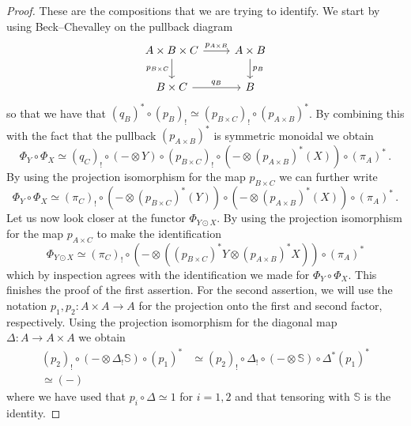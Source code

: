 \documentclass[10pt,a4paper]{amsart}
\newcommand{\bS}{\mathbb{S}}
\begin{document}
\begin{proof}
  These are the compositions that we are trying to identify.
  We start by using Beck--Chevalley on the pullback diagram
  \[
  \begin{tikzcd}
    A \times B \times C \arrow[r,"p_{A \times B}"] \arrow[d,"p_{B \times C}"'] & A \times B \arrow[d,"p_B"] \\
    B \times C \arrow[r,"q_B"] & B
  \end{tikzcd}
  \]
  so that we have that $(q_B)^* \circ (p_B)_! \simeq (p_{B \times C})_! \circ (p_{A \times B})^*$. By combining this with the fact that the pullback $(p_{A \times B})^*$ is symmetric monoidal we obtain
  \[
  \Phi_Y \circ \Phi_X \simeq (q_C)_! \circ (-\otimes Y) \circ (p_{B \times C})_! \circ (- \otimes (p_{A \times B})^*(X)) \circ (\pi_A)^* \,.
  \]
  By using the projection isomorphism for the map $p_{B \times C}$ we can further write
  \[
  \Phi_Y \circ \Phi_X \simeq (\pi_C)_! \circ (-\otimes (p_{B \times C})^*(Y)) \circ (- \otimes (p_{A \times B})^*(X)) \circ (\pi_A)^* \,.
  \]
  Let us now look closer at the functor $\Phi_{Y \odot X}$. By using the projection isomorphism for the map $p_{A \times C}$ to make the identification
  \[
  \Phi_{Y \odot X} \simeq (\pi_{C})_! \circ (- \otimes ((p_{B \times C})^* Y \otimes (p_{A \times B})^* X)) \circ (\pi_A)^*
  \]
  which by inspection agrees with the identification we made for $\Phi_Y \circ \Phi_X$. This finishes the proof of the first assertion.
  For the second assertion, we will use the notation $p_1 , p_2 : A \times A \to A$  for the projection onto the first and second factor, respectively.
  Using the projection isomorphism for the diagonal map $\Delta : A \to A \times A$ we obtain
  \begin{align*}
    (p_2)_!\circ (- \otimes \Delta_! \bS)\circ (p_1)^* &\simeq (p_2)_! \circ \Delta_! \circ (- \otimes \bS) \circ \Delta^* (p_1)^* \\ \simeq (-)
  \end{align*}
  where we have used that $p_i \circ \Delta \simeq 1$ for $i=1,2$ and that tensoring with $\bS$ is the identity.
\end{proof}
\end{document}
